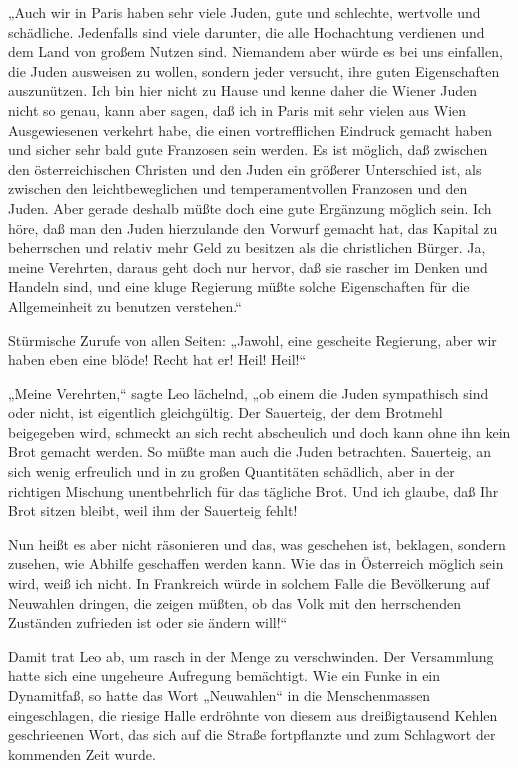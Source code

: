 „Auch wir in Paris haben sehr viele Juden, gute und schlechte,
wertvolle und schädliche. Jedenfalls sind viele darunter, die alle
Hochachtung verdienen und dem Land von großem Nutzen sind.
Niemandem aber würde es bei uns einfallen, die Juden ausweisen zu
wollen, sondern jeder versucht, ihre guten Eigenschaften
auszunützen. Ich bin hier nicht zu Hause und kenne daher die Wiener
Juden nicht so genau, kann aber sagen, daß ich in Paris mit sehr
vielen aus Wien Ausgewiesenen verkehrt habe, die einen
vortrefflichen Eindruck gemacht haben und sicher sehr bald gute
Franzosen sein werden. Es ist möglich, daß zwischen den
österreichischen Christen und den Juden ein größerer Unterschied
ist, als zwischen den leichtbeweglichen und temperamentvollen
Franzosen und den Juden. Aber gerade deshalb müßte doch eine gute
Ergänzung möglich sein.  Ich höre, daß man den
Juden hierzulande den Vorwurf gemacht hat, das Kapital zu
beherrschen und relativ mehr Geld zu besitzen als die christlichen
Bürger. Ja, meine Verehrten, daraus geht doch nur hervor, daß sie
rascher im Denken und Handeln sind, und eine kluge Regierung müßte
solche Eigenschaften für die Allgemeinheit zu benutzen verstehen.“

Stürmische Zurufe von allen Seiten: „Jawohl, eine gescheite
Regierung, aber wir haben eben eine blöde! Recht hat er! Heil!
Heil!“

„Meine Verehrten,“ sagte Leo lächelnd, „ob einem die Juden
sympathisch sind oder nicht, ist eigentlich gleichgültig. Der
Sauerteig, der dem Brotmehl beigegeben wird, schmeckt an sich recht
abscheulich und doch kann ohne ihn kein Brot gemacht werden. So
müßte man auch die Juden betrachten. Sauerteig, an sich wenig
erfreulich und in zu großen Quantitäten schädlich, aber in der
richtigen Mischung unentbehrlich für das tägliche Brot. Und ich
glaube, daß Ihr Brot sitzen bleibt, weil ihm der Sauerteig fehlt!

Nun heißt es aber nicht räsonieren und das, was geschehen ist,
beklagen, sondern zusehen, wie Abhilfe geschaffen werden kann. Wie
das in Österreich möglich sein wird, weiß ich nicht. In Frankreich
würde in solchem Falle die Bevölkerung auf Neuwahlen dringen, die
zeigen müßten, ob das Volk mit den herrschenden Zuständen zufrieden
ist oder sie ändern will!“

Damit trat Leo ab, um rasch in der Menge zu verschwinden. Der
Versammlung hatte sich eine ungeheure Aufregung bemächtigt. Wie ein
Funke in ein Dynamitfaß, so  hatte das Wort
„Neuwahlen“ in die Menschenmassen eingeschlagen, die riesige Halle
erdröhnte von diesem aus dreißigtausend Kehlen geschrieenen Wort,
das sich auf die Straße fortpflanzte und zum Schlagwort der
kommenden Zeit wurde.

